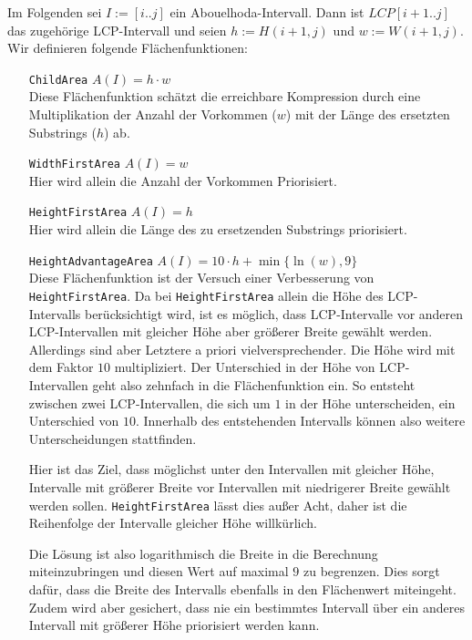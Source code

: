Im Folgenden sei $I := [i..j]$ ein Abouelhoda-Intervall. Dann ist $LCP[i+1..j]$ das zugehörige LCP-Intervall und seien $h := H(i+1, j)$ und $w := W(i+1, j)$. Wir definieren folgende Flächenfunktionen:

\begin{itemize}[leftmargin=3.6cm]
    \item[\texttt{ChildArea}] $A(I) = h \cdot w$\\
    Diese Flächenfunktion schätzt die erreichbare Kompression durch eine Multiplikation der Anzahl der Vorkommen ($w$) mit der Länge des ersetzten Substrings ($h$) ab.
    \item[\texttt{WidthFirstArea}] $A(I) = w$\\ Hier wird allein die Anzahl der Vorkommen Priorisiert.
    \item[\texttt{HeightFirstArea}] $A(I) = h$\\
    Hier wird allein die Länge des zu ersetzenden Substrings priorisiert.
    \item[\texttt{HeightAdvantageArea}] $A(I) = 10 \cdot h + \min\{\ln(w), 9\}$\\ 
    Diese Flächenfunktion ist der Versuch einer Verbesserung von \\
    \texttt{HeightFirstArea}. Da bei \texttt{HeightFirstArea} allein die Höhe des LCP-Intervalls berücksichtigt wird, ist es möglich, dass LCP-Intervalle vor anderen LCP-Intervallen mit gleicher Höhe aber größerer Breite gewählt werden. Allerdings sind aber Letztere a priori vielversprechender. Die Höhe wird mit dem Faktor $10$ multipliziert. Der Unterschied in der Höhe von LCP-Intervallen geht also zehnfach in die Flächenfunktion ein. So entsteht zwischen zwei LCP-Intervallen, die sich um $1$ in der Höhe unterscheiden, ein Unterschied von $10$. Innerhalb des entstehenden Intervalls können also weitere Unterscheidungen stattfinden. 

    Hier ist das Ziel, dass möglichst unter den Intervallen mit gleicher Höhe, Intervalle mit größerer Breite vor Intervallen mit niedrigerer Breite gewählt werden sollen. \texttt{HeightFirstArea} lässt dies außer Acht, daher ist die Reihenfolge der Intervalle gleicher Höhe willkürlich.

    Die Lösung ist also  logarithmisch die Breite in die Berechnung miteinzubringen und diesen Wert auf maximal $9$ zu begrenzen. Dies sorgt dafür, dass die Breite des Intervalls ebenfalls in den Flächenwert miteingeht. Zudem wird aber gesichert, dass nie ein bestimmtes Intervall über ein anderes Intervall mit größerer Höhe priorisiert werden kann. 
    

\end{itemize}
